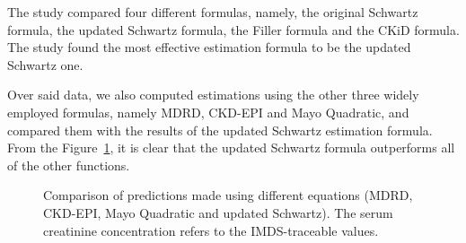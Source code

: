 \documentclass[10pt,final]{siamltex}
\begin{document}
The study \cite{gfr} compared four different formulas, namely, the original Schwartz formula, the updated Schwartz formula, the Filler formula and the CKiD formula. The study found the most effective estimation formula to be the updated Schwartz one.

Over said data, we also computed estimations using the other three widely employed formulas, namely MDRD, CKD-EPI and Mayo Quadratic, and compared them with the results of the updated Schwartz estimation formula. From the Figure~\ref{equations}, it is clear that the updated Schwartz formula outperforms all of the other functions.
%
\begin{figure}[ht]
  \centering
  \caption{Comparison of predictions made using different equations (MDRD, CKD-EPI, Mayo Quadratic and updated Schwartz). The serum creatinine concentration refers to the IMDS-traceable values.}
  \label{equations}
\end{figure}
\end{document}
